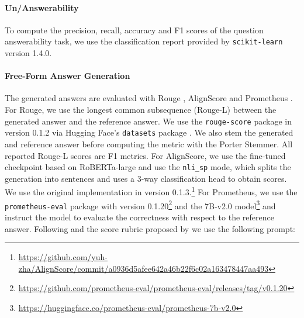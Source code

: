 \paragraph{Un/Answerability} To compute the precision, recall, accuracy and F1 scores of the question answerability task, we use the classification report provided by \texttt{scikit-learn} \citep{scikit-learn} version 1.4.0.
\paragraph{Free-Form Answer Generation} The generated answers are evaluated with Rouge \citep{lin-2004-rouge}, AlignScore \citep{zha-etal-2023-alignscore} and Prometheus \citep{kim-etal-2024-prometheus}. 
For Rouge, we use the longest common subsequence (Rouge-L) between the generated answer and the reference answer. We use the \texttt{rouge-score} package in version 0.1.2 via Hugging Face's \texttt{datasets} package \cite{lhoest-etal-2021-datasets}. We also stem the generated and reference answer before computing the metric with the Porter Stemmer. All reported Rouge-L scores are F1 metrics.
For AlignScore, we use the fine-tuned checkpoint based on RoBERTa-large \citep{roberta} and use the \texttt{nli\_sp} mode, which splits the generation into sentences and uses a 3-way classification head to obtain scores. We use the original implementation in version 0.1.3.\footnote{\url{https://github.com/yuh-zha/AlignScore/commit/a0936d5afee642a46b22f6c02a163478447aa493}} For Prometheus, we use the \texttt{prometheus-eval} package with version 0.1.20\footnote{\url{https://github.com/prometheus-eval/prometheus-eval/releases/tag/v0.1.20}} and the  7B-v2.0 model\footnote{\url{https://huggingface.co/prometheus-eval/prometheus-7b-v2.0}} and instruct the model to evaluate the correctness with respect to the reference answer. Following \citet{kim-etal-2024-prometheus} and the score rubric proposed by \citet{rag-rubic-haystack} we use the following prompt:\\
